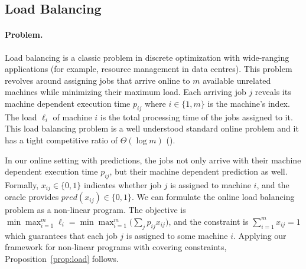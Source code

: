 \subsection{Load Balancing}

\paragraph{Problem.}
Load balancing is a classic problem in discrete optimization with wide-ranging applications (for example, resource management in data centres).
This problem revolves around assigning jobs that arrive online to $m$ available unrelated machines while minimizing their maximum load.
Each arriving job $j$ reveals its machine dependent execution time $p_{ij}$ where $i \in \{1, m\}$ is the machine's index. The load $\ell_{i}$ of machine $i$ is the total processing time of the jobs assigned
to it. This load balancing problem is a well understood standard online problem and it has a tight competitive ratio of $\Theta(\log m)$ (\cite{BorodinEl-Yaniv05:Online-computation,Caragiannis08:Better-bounds}).

In our online setting with predictions, the jobs not only arrive with their machine dependent execution time $p_{ij}$, but their machine dependent prediction as well. Formally, $x_{ij} \in \{0,1\}$ indicates whether job $j$ is assigned to machine $i$, and the oracle provides $pred(x_{ij}) \in \{0,1\}$. We can formulate the online load balancing problem as a non-linear program. The objective is $\min \max_{i=1}^{m} \ell_{i} = \min \max_{i=1}^{m} \bigl(\sum_{j} p_{ij} x_{ij}\bigr)$, and the constraint is $\sum_{i=1}^{m} x_{ij} = 1$ which guarantees that each job $j$ is assigned to some machine $i$. Applying our framework for non-linear programs with covering constraints, Proposition~\ref{prop:load} follows.

